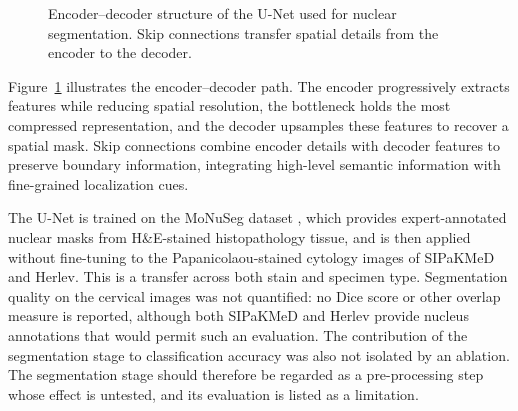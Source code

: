 \documentclass[conference]{IEEEtran}
\begin{document}
\begin{figure}[t]
\centering
{}

\caption{Encoder--decoder structure of the U-Net used for nuclear segmentation. Skip connections transfer spatial details from the encoder to the decoder.}
\label{fig:unet}
\end{figure}

Figure~\ref{fig:unet} illustrates the encoder--decoder path. The encoder progressively extracts features while reducing spatial resolution, the bottleneck holds the most compressed representation, and the decoder upsamples these features to recover a spatial mask. Skip connections combine encoder details with decoder features to preserve boundary information, integrating high-level semantic information with fine-grained localization cues.

The U-Net is trained on the MoNuSeg dataset \cite{kumar2017monuseg}, which provides expert-annotated nuclear masks from H\&E-stained histopathology tissue, and is then applied without fine-tuning to the Papanicolaou-stained cytology images of SIPaKMeD and Herlev. This is a transfer across both stain and specimen type. Segmentation quality on the cervical images was not quantified: no Dice score or other overlap measure is reported, although both SIPaKMeD and Herlev provide nucleus annotations that would permit such an evaluation. The contribution of the segmentation stage to classification accuracy was also not isolated by an ablation. The segmentation stage should therefore be regarded as a pre-processing step whose effect is untested, and its evaluation is listed as a limitation.
\end{document}
